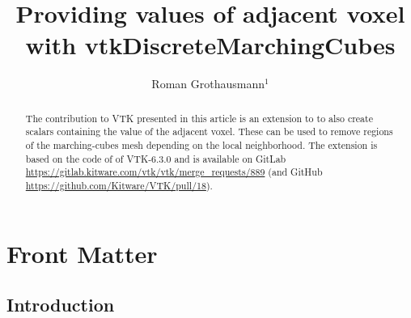 \documentclass{InsightArticle}
\title{Providing values of adjacent voxel \\ with vtkDiscreteMarchingCubes}
\author{Roman Grothausmann$^{1}$}
\newcommand{\IJhandlerIDnumber}{xxxx}
\begin{document}
%
%
\IJhandlefooter{\IJhandlerIDnumber}


\ifpdf
\else
\fi


\maketitle


\ifhtml
\chapter*{Front Matter\label{front}}
\fi


\begin{abstract}
\noindent
The contribution to VTK presented in this article is an extension to  to also create  scalars containing the value of the adjacent voxel. These can be used to remove regions of the marching-cubes\citep{Lorensen1987} mesh depending on the local neighborhood.
The extension is based on the code of  of VTK-6.3.0 and is available on GitLab \url{https://gitlab.kitware.com/vtk/vtk/merge_requests/889} (and GitHub \url{https://github.com/Kitware/VTK/pull/18}).
\end{abstract}

\IJhandlenote{\IJhandlerIDnumber}

\tableofcontents

\pagebreak

\section{Introduction}
\end{document}
